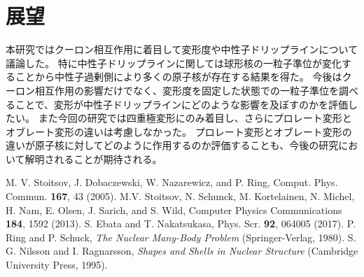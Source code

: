 \documentclass[12pt]{jarticle}
\begin{document}
\section{展望}
本研究ではクーロン相互作用に着目して変形度や中性子ドリップラインについて議論した。
特に中性子ドリップラインに関しては球形核の一粒子準位が変化することから中性子過剰側により多くの原子核が存在する結果を得た。
今後はクーロン相互作用の影響だけでなく、変形度を固定した状態での一粒子準位を調べることで、変形が中性子ドリップラインにどのような影響を及ぼすのかを評価したい。
また今回の研究では四重極変形にのみ着目し、さらにプロレート変形とオブレート変形の違いは考慮しなかった。
プロレート変形とオブレート変形の違いが原子核に対してどのように作用するのか評価することも、今後の研究において解明されることが期待される。

\begin{thebibliography}{99}
M. V. Stoitsov, J. Dobaczewski, W. Nazarewicz, and P. Ring,
Comput. Phys. Commun. \textbf{167}, 43 (2005).
M.V. Stoitsov, N. Schunck, M. Kortelainen, N. Michel, H. Nam, E. Olsen,
J. Sarich, and S. Wild,
Computer Physics Communications \textbf{184}, 1592 (2013).
 S. Ebata and T. Nakatsukasa, Phys. Scr. \textbf{92},
064005 (2017).
P. Ring and P. Schuck, \emph{The Nuclear Many-Body Problem}
(Springer-Verlag, 1980).
S. G. Nilsson and I. Ragnarsson,
\emph{Shapes and Shells in Nuclear Structure}
(Cambridge University Press, 1995).
\end{thebibliography}
\end{document}
